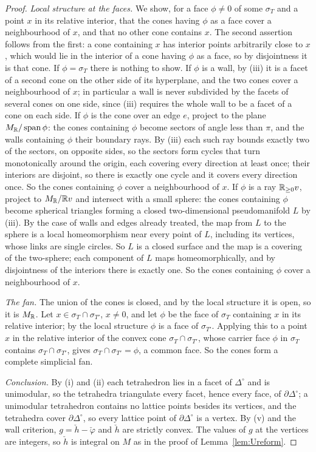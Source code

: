 \begin{proof}
\emph{Local structure at the faces.} We show, for a face $\phi\neq0$ of some $\sigma_T$ and a point $x$ in its relative interior,
that the cones having $\phi$ as a face cover a neighbourhood of $x$, and that no other cone contains $x$. The second
assertion follows from the first: a cone containing $x$ has interior points arbitrarily close to $x$, which would lie in the
interior of a cone having $\phi$ as a face, so by disjointness it is that cone. If $\phi=\sigma_T$ there is nothing to show.
If $\phi$ is a wall, by (iii) it is a facet of a second cone on the other side of its hyperplane, and the two cones cover a
neighbourhood of $x$; in particular a wall is never subdivided by the facets of several cones on one side, since (iii)
requires the whole wall to be a facet of a cone on each side. If $\phi$ is the cone over an edge $e$, project to the plane
$M_\mathbb R/\operatorname{span}\phi$: the cones containing $\phi$ become sectors of angle less than $\pi$, and the walls
containing $\phi$ their boundary rays. By (iii) each such ray bounds exactly two of the sectors, on opposite sides, so the
sectors form cycles that turn monotonically around the origin, each covering every direction at least once; their
interiors are disjoint, so there is exactly one cycle and it covers every direction once. So the cones containing $\phi$
cover a neighbourhood of $x$. If $\phi$ is a ray $\mathbb R_{\ge0}v$, project to $M_\mathbb R/\mathbb R v$ and intersect with a small sphere: the
cones containing $\phi$ become spherical triangles forming a closed two-dimensional pseudomanifold $L$ by (iii). By the case
of walls and edges already treated, the map from $L$ to the sphere is a local homeomorphism near every point of $L$,
including its vertices, whose links are single circles. So $L$ is a closed surface and the map is a covering of the
two-sphere; each component of $L$ maps homeomorphically, and by disjointness of the interiors there is exactly one. So the
cones containing $\phi$ cover a neighbourhood of $x$.

\emph{The fan.} The union of the cones is closed, and by the local structure it is open, so it is $M_\mathbb R$. Let
$x\in\sigma_T\cap\sigma_{T'}$, $x\neq0$, and let $\phi$ be the face of $\sigma_T$ containing $x$ in its relative interior; by
the local structure $\phi$ is a face of $\sigma_{T'}$. Applying this to a point $x$ in the relative interior of the convex
cone $\sigma_T\cap\sigma_{T'}$, whose carrier face $\phi$ in $\sigma_T$ contains $\sigma_T\cap\sigma_{T'}$, gives
$\sigma_T\cap\sigma_{T'}=\phi$, a common face. So the cones form a complete simplicial fan.

\emph{Conclusion.} By (i) and (ii) each tetrahedron lies in a facet of $\Delta^\circ$ and is unimodular, so the tetrahedra
triangulate every facet, hence every face, of $\partial\Delta^\circ$; a unimodular tetrahedron contains no lattice points
besides its vertices, and the tetrahedra cover $\partial\Delta^\circ$, so every lattice point of $\partial\Delta^\circ$ is a
vertex. By (v) and the wall criterion, $g=\check h-\check\varphi$ and $\check h$ are strictly convex. The values of $g$ at the
vertices are integers, so $\check h$ is integral on $M$ as in the proof of Lemma~\ref{lem:Ureform}.
\end{proof}

